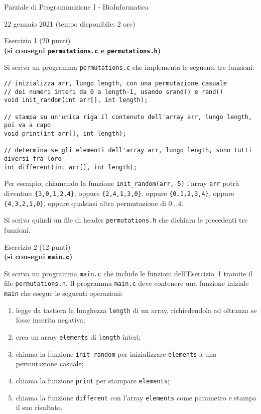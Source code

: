 \documentclass[12pt]{article}
\begin{document}
\begin{center}{\LARGE Parziale di Programmazione I - BioInformatica}\\
\vspace*{-2ex}
\begin{center}
  \large 22 gennaio 2021 (tempo disponibile: 2 ore)
\end{center}
\end{center}

\vspace*{1ex}
\begin{center}{\Large Esercizio 1} ($20$ punti)\\
  \textbf{(si consegni \texttt{permutations.c} e \texttt{permutations.h})}
\end{center}
Si scriva un programma \texttt{permutations.c} che implementa le seguenti tre funzioni:
\begin{verbatim}
// inizializza arr, lungo length, con una permutazione casuale
// dei numeri interi da 0 a length-1, usando srand() e rand()
void init_random(int arr[], int length);

// stampa su un'unica riga il contenuto dell'array arr, lungo length, poi va a capo
void print(int arr[], int length);

// determina se gli elementi dell'array arr, lungo length, sono tutti diversi fra loro
int different(int arr[], int length);
\end{verbatim}
%
Per esempio, chiamando la funzione \texttt{init\_random(arr, 5)} l'array \texttt{arr} potr\`a diventare
\texttt{\{3,0,1,2,4\}}, oppure \texttt{\{2,4,1,3,0\}},
oppure \texttt{\{0,1,2,3,4\}}, oppure \texttt{\{4,3,2,1,0\}}, oppure qualsiasi altra
permutazione di $0\ldots 4$.

Si scriva quindi un file di header \texttt{permutations.h} che dichiara le precedenti tre funzioni.

\begin{center}{\Large Esercizio 2} ($12$ punti)\\
  \textbf{(si consegni \texttt{main.c})}\end{center}
%
Si scriva un programma \texttt{main.c} che include le funzioni dell'Esercizio~1 tramite
il file \texttt{permutations.h}.
Il programma \texttt{main.c} deve contenere una funzione iniziale \texttt{main} che esegue
le seguenti operazioni:
\begin{enumerate}
\item legge da tastiera la lunghezza \texttt{length} di un array, richiedendola ad oltranza se fosse inserita negativa;
\item crea un array \texttt{elements} di \texttt{length} interi;
\item chiama la funzione \texttt{init\_random} per inizializzare \texttt{elements} a una permutazione casuale;
\item chiama la funzione \texttt{print} per stampare \texttt{elements};
\item chiama la funzione \texttt{different} con l'array \texttt{elements} come parametro e stampa il suo risultato.
\end{enumerate}
\end{document}
